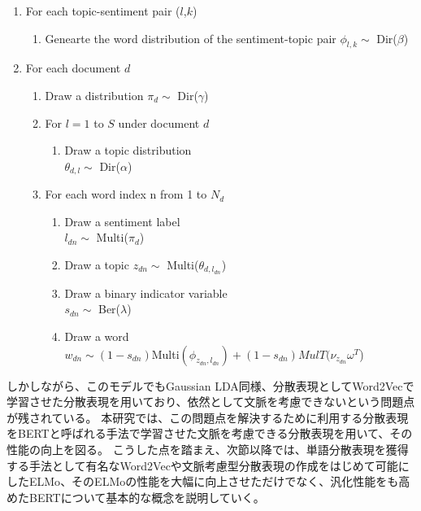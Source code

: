 \documentclass[uplatex]{jsarticle}
\begin{document}
\begin{enumerate}
    \item For each topic-sentiment pair ($l$,$k$)
          \begin{enumerate}
              \item Genearte the word distribution of the sentiment-topic pair $\phi_{l,k} \sim $ Dir($\beta$)
          \end{enumerate}
    \item For each document $d$
          \begin{enumerate}
              \item Draw a distribution $\pi_{d} \sim $ Dir($\gamma$)
              \item For $l=1$ to $S$ under document $d$
                    \begin{enumerate}
                        \item Draw a topic distribution \\ $ \theta_{d,l} \sim $ Dir($\alpha$)
                    \end{enumerate}
              \item For each word index n from 1 to $N_{d}$
                    \begin{enumerate}
                        \item Draw a sentiment label \\ $ l_{dn}  \sim$ Multi($\pi_{d}$)
                        \item Draw a topic $z_{dn} \sim $ Multi($\theta_{d, l_{dn}}$)
                        \item Draw a binary indicator variable \\ $s_{dn} \sim $ Ber($\lambda$)
                        \item Draw a word \\$w_{dn}  \sim (1-s_{dn})$Multi$(\phi_{z_{dn},l_{dn}})+(1 - s_{dn})MulT(\nu_{z_{dn}}\omega^{T}$)
                    \end{enumerate}
          \end{enumerate}
\end{enumerate}

しかしながら、このモデルでもGaussian LDA\cite{Gaussian LDA}同様、分散表現としてWord2Vec\cite{Word2Vec}で学習させた分散表現を用いており、依然として文脈を考慮できないという問題点が残されている。
本研究では、この問題点を解決するために利用する分散表現をBERT\cite{BERT}と呼ばれる手法で学習させた文脈を考慮できる分散表現を用いて、その性能の向上を図る。
こうした点を踏まえ、次節以降では、単語分散表現を獲得する手法として有名なWord2Vec\cite{Word2Vec}や文脈考慮型分散表現の作成をはじめて可能にしたELMo\cite{ELMo}、そのELMoの性能を大幅に向上させただけでなく、汎化性能をも高めたBERT\cite{BERT}について基本的な概念を説明していく。
\end{document}
